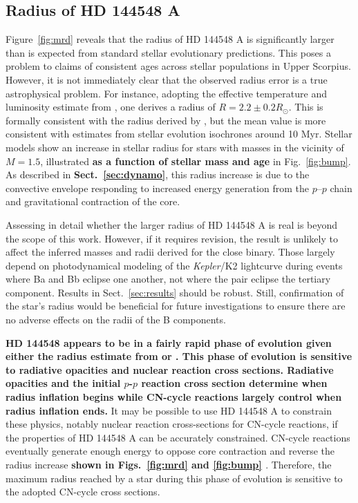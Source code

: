 \documentclass{aa}
\begin{document}
\subsection{Radius of HD 144548 A}
\label{sec:radius}
Figure~\ref{fig:mrd} reveals that the radius of HD 144548 A is significantly larger than is expected from standard stellar evolutionary predictions. This poses a problem to claims of consistent ages across stellar populations in Upper Scorpius. However, it is not immediately clear that the observed radius error is a true astrophysical problem. For instance, adopting the effective temperature and luminosity estimate from \citet{Pecaut2012}, one derives a radius of $R = 2.2 \pm 0.2 R_{\odot}$. This is formally consistent with the radius derived by \citep{Alonso2015}, but the mean value is more consistent with estimates from stellar evolution isochrones around 10 Myr. Stellar models show an increase in stellar radius for stars with masses in the vicinity of $M = 1.5$\msun, illustrated {\bf as a function of stellar mass and age} in Fig.\ \ref{fig:bump}. As described in {\bf Sect.\ \ref{sec:dynamo}}, this radius increase is due to the convective envelope responding to increased energy generation from the $p$--$p$ chain and gravitational contraction of the core.

Assessing in detail whether the larger radius of HD 144548 A is real is beyond the scope of this work. However, if it requires revision, the result is unlikely to affect the inferred masses and radii derived for the close binary. Those largely depend on photodynamical modeling of the \emph{Kepler}/K2 lightcurve during events where Ba and Bb eclipse one another, not where the pair eclipse the tertiary component. Results in Sect.~\ref{sec:results} should be robust. Still, confirmation of the star's radius would be beneficial for future investigations to ensure there are no adverse effects on the radii of the B components. 

{\bf HD 144548 appears to be in a fairly rapid phase of evolution given either the radius estimate from \cite{Pecaut2012} or \citet{Alonso2015}. This phase of evolution is sensitive to radiative opacities and nuclear reaction cross sections. Radiative opacities and the initial $p$-$p$ reaction cross section determine when radius inflation begins while CN-cycle reactions largely control when radius inflation ends.} It may be possible to use HD 144548 A to constrain these physics, notably nuclear reaction cross-sections for CN-cycle reactions, if the properties of HD 144548 A can be accurately constrained. CN-cycle reactions eventually generate enough energy to oppose core contraction and reverse the radius increase {\bf shown in Figs.\ \ref{fig:mrd} and \ref{fig:bump} \citep[also see][]{Stassun2014}}. Therefore, the maximum radius reached by a star during this phase of evolution is sensitive to the adopted CN-cycle cross sections. 
\end{document}
